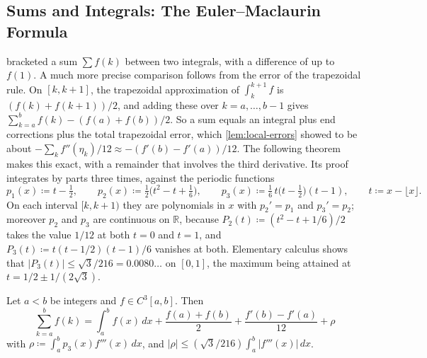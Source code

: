 \subsection{Sums and Integrals: The Euler--Maclaurin Formula}

 bracketed a sum $\sum f(k)$ between two integrals, with a difference of up to $f(1)$. A much more precise comparison follows from the error of the trapezoidal rule. On $[k,k+1]$, the trapezoidal approximation of $\int_k^{k+1}f$ is $(f(k)+f(k+1))/2$, and adding these over $k=a,\ldots,b-1$ gives $\sum_{k=a}^bf(k)-(f(a)+f(b))/2$. So a sum equals an integral plus end corrections plus the total trapezoidal error, which \cref{lem:local-errors} showed to be about $-\sum_kf''(\eta_k)/12\approx-(f'(b)-f'(a))/12$. The following theorem makes this exact, with a remainder that involves the third derivative. Its proof integrates by parts three times, against the periodic functions
\[
p_1(x)\coloneqq t-\tfrac12,\qquad p_2(x)\coloneqq\tfrac12\bigl(t^2-t+\tfrac16\bigr),\qquad p_3(x)\coloneqq\tfrac16\,t\bigl(t-\tfrac12\bigr)(t-1),\qquad t\coloneqq x-\lfloor x\rfloor .
\]
On each interval $[k,k+1)$ they are polynomials in $x$ with $p_2'=p_1$ and $p_3'=p_2$; moreover $p_2$ and $p_3$ are continuous on $\mathbb R$, because $P_2(t)\coloneqq(t^2-t+1/6)/2$ takes the value $1/12$ at both $t=0$ and $t=1$, and $P_3(t)\coloneqq t(t-1/2)(t-1)/6$ vanishes at both. Elementary calculus shows that $|P_3(t)|\le\sqrt3/216=0.0080\ldots$ on $[0,1]$, the maximum being attained at $t=1/2\pm1/(2\sqrt3)$.

\begin{theorem}
\label{thm:euler-maclaurin}
Let $a<b$ be integers and $f\in C^3[a,b]$. Then
\[
\sum_{k=a}^bf(k)=\int_a^bf(x)\,dx+\frac{f(a)+f(b)}2+\frac{f'(b)-f'(a)}{12}+\rho
\]
with $\rho\coloneqq\int_a^bp_3(x)f'''(x)\,dx$, and $|\rho|\le(\sqrt3/216)\int_a^b|f'''(x)|\,dx$.
\end{theorem}

